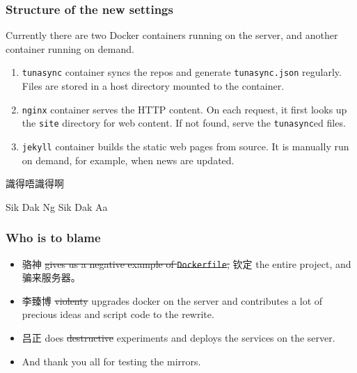 \documentclass{beamer}
\begin{document}
\begin{frame}
\frametitle{Structure of the new settings}
Currently there are two Docker containers running on the server, and another
container running on demand.

\begin{enumerate}
\item \texttt{tunasync} container syncs the repos and generate
\texttt{tunasync.json} regularly. Files are stored in a host directory mounted
to the container.
\item \texttt{nginx} container serves the HTTP content. On each request, it
first looks up the \texttt{site} directory for web content. If not found, serve
the \texttt{tunasync}ed files.
\item \texttt{jekyll} container builds the static web pages from source. It is
manually run on demand, for example, when news are updated.

\end{enumerate}
\end{frame}


\begin{frame}
\begin{CJK}{UTF8}{bsmi}
\huge{\centerline{識得唔識得啊}}
\large{\centerline{Sik Dak Ng Sik Dak Aa}}
\end{CJK}
\end{frame}


\begin{frame}
\frametitle{Who is to blame}
\begin{CJK}{UTF8}{gbsn}
\begin{itemize}
\item 骆神 \sout{gives us a negative example of \texttt{Dockerfile},} 钦定 the
entire project, and 骗来服务器。
\item 李臻博 \sout{violenty} upgrades docker on the server and contributes a
lot of precious ideas and script code to the rewrite.
\item 吕正 does \sout{destructive} experiments and deploys the services on the
server.
\item And thank you all for testing the mirrors.
\end{itemize}
\end{CJK}
\end{frame}

\end{document}
